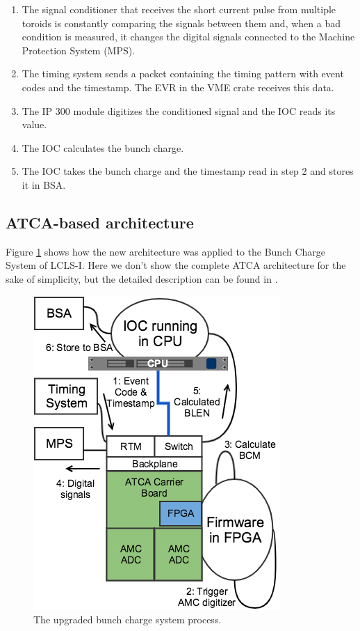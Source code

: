 \documentclass[letter,
        biblatex,   %
        keeplastbox,  %
        ]{jacow}
\begin{document}
\begin{enumerate}
  \item The signal conditioner that receives the short current pulse from multiple toroids is constantly comparing the signals between them and, when a bad condition is measured, it changes the digital signals connected to the Machine Protection System (MPS).
  \item The timing system sends a packet containing the timing pattern with event codes and the timestamp. The EVR in the VME crate receives this data.
  \item The IP 300 module digitizes the conditioned signal and the IOC reads its value.
  \item The IOC calculates the bunch charge.
  \item The IOC takes the bunch charge and the timestamp read in step 2 and stores it in BSA.
\end{enumerate}

\subsection{ATCA-based architecture}
Figure \ref{fig:bcm_atca} shows how the new architecture was applied to the Bunch Charge System of LCLS-I. Here we don't show the complete ATCA architecture for the sake of simplicity, but the detailed description can be found in \cite{ryan-2016, atca-bpm-2017}.

\begin{figure}[!htb]
  \centering
  \includegraphics*[width=.8\columnwidth]{BCM_ATCA_Process}
  \caption{The upgraded bunch charge system process.}
  \label{fig:bcm_atca}
\end{figure}
\end{document}
